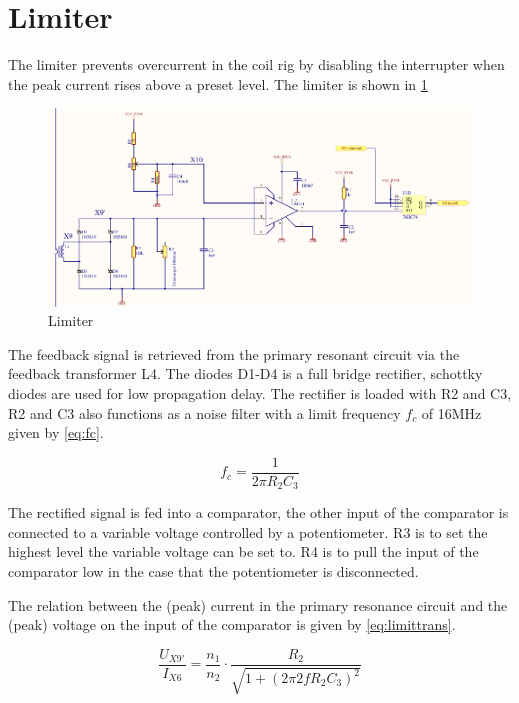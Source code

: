 \newpage
\section{Limiter}
\label{sec:limiter}

The limiter prevents overcurrent in the coil rig by disabling the interrupter when the peak current rises above a preset level. The limiter is shown in \cref{fig:limiter}

\begin{figure}[h!]
    \centering
    \includegraphics[width=\textwidth]{Skjema/TK513_Limiter.pdf}
    \caption{Limiter}
    \label{fig:limiter}
\end{figure}

The feedback signal is retrieved from the primary resonant circuit via the feedback transformer L4. The diodes D1-D4 is a full bridge rectifier, schottky diodes are used for low propagation delay. The rectifier is loaded with R2 and C3, R2 and C3 also functions as a noise filter with a limit frequency $f_c$ of 16MHz given by \cref{eq:fc}.

\begin{equation} \label{eq:fc}
    f_c = \frac{1}{2 \pi R_2 C_3}
\end{equation}

The rectified signal is fed into a comparator, the other input of the comparator is connected to a variable voltage controlled by a potentiometer. R3 is to set the highest level the variable voltage can be set to. R4 is to pull the input of the comparator low in the case that the potentiometer is disconnected.

The relation between the (peak) current in the primary resonance circuit and the (peak) voltage on the input of the comparator is given by \cref{eq:limittrans}.

\begin{equation} \label{eq:limittrans}
    \frac{U_{X9'}}{I_{X6}} = \frac{n_1}{n_2} \cdot \frac{R_2}{\sqrt{1+(2 \pi 2 f R_2 C_3)^2}}
\end{equation}

